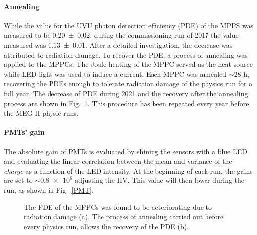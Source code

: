 \begin{refsection}
        \paragraph{Annealing}
        While the value for the UVU photon detection efficiency (PDE) of the MPPS was measured to be \num{0.20(2)}, during the commissioning run of 2017 the value measured was \num{0.13(1)}.
        After a detailed investigation, the decrease was attributed to radiation damage.
        To recover the PDE, a process of annealing was applied to the MPPCs.
        The Joule heating of the MPPC served as the heat source while LED light was used to induce a current.  
        Each MPPC was annealed $\sim28$ h, recovering the PDEs enough to tolerate radiation damage of the physics run for a full year.
        The decrease of PDE during 2021 and the recovery after the annealing process are shown in Fig.~\ref{fig:MEC:XEC:PDE}.
        This procedure has been repeated every year before the MEG II physic runs.

        \paragraph{PMTs' gain} The absolute gain of PMTs is evaluated by shining the sensors with a blue LED and evaluating the linear correlation between the mean and variance of the \textit{charge} as a function of the LED intensity.
        At the beginning of each run, the gains are set to $\sim\num{0.8e6}$ adjusting the HV. 
        This value will then lower during the run, as shown in Fig.~\ref{PMT}.

         \begin{figure}[]   
            \centering
            \caption{The PDE of the MPPCs was found to be deteriorating due to radiation damage (a). The process of annealing carried out before every physics run, allows the recovery of the PDE (b).}
            \label{fig:MEC:XEC:PDE}
        \end{figure}
        

\end{refsection}
